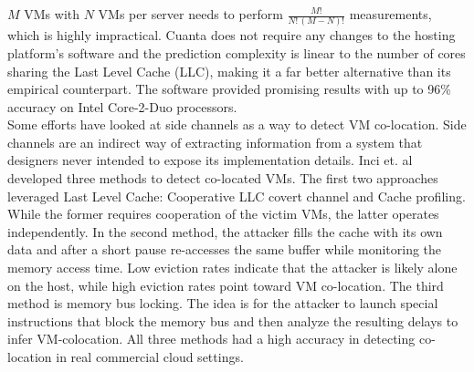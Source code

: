 $M$ VMs with $N$ VMs per server needs to perform $\frac{M!}{N!\,(M-N)!}$ measurements, which is
highly impractical. Cuanta does not require any changes to the hosting platform's software and the 
prediction complexity is linear to the number of cores sharing the Last Level Cache (LLC), 
making it a far better alternative than its empirical counterpart. 
The software provided promising results with up to 96\% accuracy on Intel Core-2-Duo processors. \\
Some efforts have looked at side channels as a way to detect VM co-location. Side channels are an indirect
way of extracting information from a system that designers never intended to expose its implementation
details. Inci et. al \cite{LLC} developed three methods to detect co-located VMs. 
The first two approaches leveraged Last Level Cache: Cooperative LLC covert channel and  
Cache profiling. While the former requires cooperation of the victim VMs, the latter operates
independently. In the second method, the attacker fills the cache with its own data and after a
short pause re-accesses the same buffer while monitoring the memory access time. Low eviction rates
indicate that the attacker is likely alone on the host, while high eviction rates point toward 
VM co-location. The third method is memory bus locking. The idea is for the attacker to launch 
special instructions that block the memory bus and then analyze the resulting delays to infer 
VM-colocation. All three methods had a high accuracy in detecting co-location in real commercial cloud
settings.

\begin{comment}
They also investigated performance variation that's caused by hardware heterogeneity
in the same instance type. They examined this trend on 12 VM types across 1st (m1, c1), 2nd (m2), 
and 3rd (c3) EC2 generationand found that 25\% of the types had more than one hardware implementation. They implemented the virtual 
machine scaler, a web services application, that helps with VM management/placement on AWS. 
It features the "forceCpuType" parameter, that allows the user to specify the backing CPU, enforcing hardware 
homogeneity. Mon-matching VMs are repeatedly terminated until the "right" CPU is allocated. 
With this, they were able to improve scientific modeling web services performance by up to 14\%.
\end{comment}